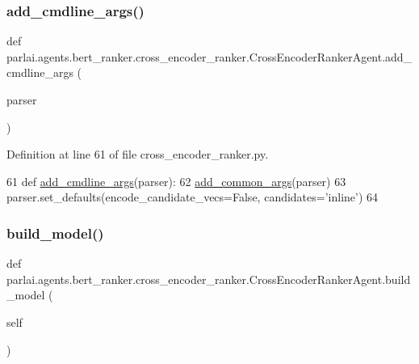 \subsubsection{\texorpdfstring{add\+\_\+cmdline\+\_\+args()}{add\_cmdline\_args()}}
{\footnotesize\ttfamily def parlai.\+agents.\+bert\+\_\+ranker.\+cross\+\_\+encoder\+\_\+ranker.\+Cross\+Encoder\+Ranker\+Agent.\+add\+\_\+cmdline\+\_\+args (\begin{DoxyParamCaption}\item[{}]{parser }\end{DoxyParamCaption})\hspace{0.3cm}{\ttfamily [static]}}



Definition at line 61 of file cross\+\_\+encoder\+\_\+ranker.\+py.


\begin{DoxyCode}
61     \textcolor{keyword}{def }\hyperlink{namespaceparlai_1_1agents_1_1drqa_1_1config_a62fdd5554f1da6be0cba185271058320}{add\_cmdline\_args}(parser):
62         \hyperlink{namespaceparlai_1_1agents_1_1bert__ranker_1_1helpers_ac2e926c3aba3a62be09e2c37dffcaee2}{add\_common\_args}(parser)
63         parser.set\_defaults(encode\_candidate\_vecs=\textcolor{keyword}{False}, candidates=\textcolor{stringliteral}{'inline'})
64 
\end{DoxyCode}
\mbox{\label{classparlai_1_1agents_1_1bert__ranker_1_1cross__encoder__ranker_1_1CrossEncoderRankerAgent_a0754f7cf281a0223667ffb82c846a843}} 
\subsubsection{\texorpdfstring{build\+\_\+model()}{build\_model()}}
{\footnotesize\ttfamily def parlai.\+agents.\+bert\+\_\+ranker.\+cross\+\_\+encoder\+\_\+ranker.\+Cross\+Encoder\+Ranker\+Agent.\+build\+\_\+model (\begin{DoxyParamCaption}\item[{}]{self }\end{DoxyParamCaption})}



